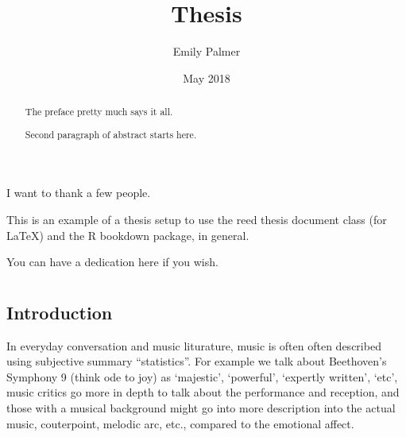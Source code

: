 \documentclass[12pt,twoside]{reedthesis}
\title{Thesis}
\author{Emily Palmer}
\date{May 2018}
\theoremstyle{definition}
\theoremstyle{definition}
\theoremstyle{definition}
\theoremstyle{remark}
\begin{document}
  \maketitle

\frontmatter %
\pagestyle{empty} %
  \begin{acknowledgements}
    I want to thank a few people.
  \end{acknowledgements}
  \begin{preface}
    This is an example of a thesis setup to use the reed thesis document
    class (for LaTeX) and the R bookdown package, in general.
  \end{preface}
  \hypersetup{linkcolor=black}
  \setcounter{tocdepth}{2}
  \tableofcontents

  \listoftables

  \listoffigures
  \begin{abstract}
    The preface pretty much says it all. \par
    
    Second paragraph of abstract starts here.
  \end{abstract}
  \begin{dedication}
    You can have a dedication here if you wish.
  \end{dedication}
\mainmatter %
\pagestyle{fancyplain} %

\chapter{}\label{section}

\section{Introduction}\label{introduction}

In everyday conversation and music liturature, music is often often
described using subjective summary ``statistics''. For example we talk
about Beethoven's Symphony 9 (think ode to joy) as `majestic',
`powerful', `expertly written', `etc', music critics go more in depth to
talk about the performance and reception, and those with a musical
background might go into more description into the actual music,
couterpoint, melodic arc, etc., compared to the emotional affect.
\end{document}
